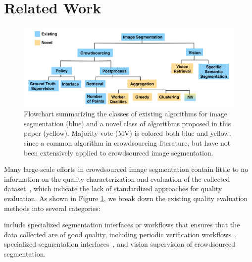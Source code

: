 \section{Related Work\label{sec:related}}
\begin{figure}[h!]
\centering
\includegraphics[width=\linewidth]{plots/flowchart.png}
\caption{Flowchart summarizing the classes of existing algorithms for image segmentation (blue) and a novel class of algorithms proposed in this paper (yellow). Majority-vote (MV) is colored both blue and yellow, since a common algorithm in crowdsourcing literature, but have not been extensively applied to crowdsourced image segmentation.}
\vspace{-10pt}
\label{flowchart}
\end{figure}
Many large-scale efforts in crowdsourced image segmentation contain little to no information on the quality characterization and evaluation of the collected dataset~\cite{Torralba2010,MartinFTM01,Li2009,Gurari2015}, which indicate the lack of standardized approaches for quality evaluation. As shown in Figure \ref{flowchart}, we break down the existing quality evaluation methods into several categories:

 include specialized segmentation interfaces or workflows that ensures that the data collected are of good quality, including periodic verification workflows~\cite{Lin2014,Everingham15}, specialized segmentation interfaces~\cite{Song2018}, and vision supervision of crowdsourced segmentation\cite{Russakovsky2015,Gurari2016}. %

